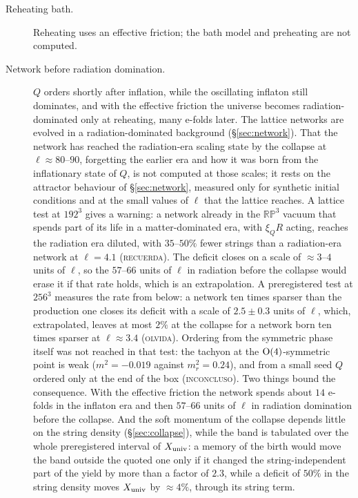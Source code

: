 \documentclass[11pt,a4paper]{article}
\newcommand{\RP}{\mathbb{RP}^3}
\newcommand{\Xu}{X_{\rm univ}}
\begin{document}
\begin{description}
\item[Reheating bath.] Reheating uses an effective friction; the bath model and preheating are not computed.
\item[Network before radiation domination.] $Q$ orders shortly after inflation, while the oscillating inflaton still dominates, and with the effective friction the universe becomes radiation-dominated only at reheating, many e-folds later. The lattice networks are evolved in a radiation-dominated background (\S\ref{sec:network}). That the network has reached the radiation-era scaling state by the collapse at $\ell\approx80$--$90$, forgetting the earlier era and how it was born from the inflationary state of $Q$, is not computed at those scales; it rests on the attractor behaviour of \S\ref{sec:network}, measured only for synthetic initial conditions and at the small values of $\ell$ that the lattice reaches. A lattice test at $192^3$ gives a warning: a network already in the $\RP$ vacuum that spends part of its life in a matter-dominated era, with $\xi_QR$ acting, reaches the radiation era diluted, with $35$--$50\%$ fewer strings than a radiation-era network at $\ell=4.1$ (\textsc{recuerda}). The deficit closes on a scale of $\approx3$--$4$ units of $\ell$, so the $57$--$66$ units of $\ell$ in radiation before the collapse would erase it if that rate holds, which is an extrapolation. A preregistered test at $256^3$ measures the rate from below: a network ten times sparser than the production one closes its deficit with a scale of $2.5\pm0.3$ units of $\ell$, which, extrapolated, leaves at most $2\%$ at the collapse for a network born ten times sparser at $\ell\approx3.4$ (\textsc{olvida}). Ordering from the symmetric phase itself was not reached in that test: the tachyon at the ${\rm O}(4)$-symmetric point is weak ($m^2=-0.019$ against $m_r^2=0.24$), and from a small seed $Q$ ordered only at the end of the box (\textsc{inconcluso}). Two things bound the consequence. With the effective friction the network spends about $14$ e-folds in the inflaton era and then $57$--$66$ units of $\ell$ in radiation domination before the collapse. And the soft momentum of the collapse depends little on the string density (\S\ref{sec:collapse}), while the band is tabulated over the whole preregistered interval of $\Xu$: a memory of the birth would move the band outside the quoted one only if it changed the string-independent part of the yield by more than a factor of $2.3$, while a deficit of $50\%$ in the string density moves $\Xu$ by $\approx4\%$, through its string term.
\end{description}
\end{document}
